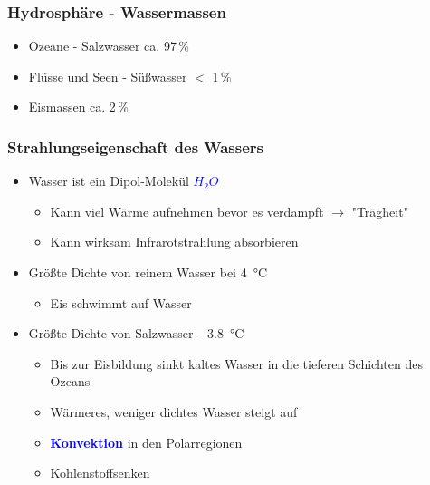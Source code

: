 \begin{frame}
	\frametitle{Hydrosphäre - Wassermassen}
	\begin{itemize}
		\item Ozeane - Salzwasser ca. 97\,\%
		\item Flüsse und Seen - Süßwasser $<$ 1\,\%
		\item Eismassen ca. 2\,\% %
	\end{itemize}
\end{frame}


\begin{frame}
	\frametitle{Strahlungseigenschaft des Wassers} %
	\begin{itemize}
		\item Wasser ist ein Dipol-Molekül \textcolor{blue}{$H_2O$}
		\begin{itemize}			
			\item<2->[$\rightarrow$] Kann viel Wärme aufnehmen bevor es verdampft $\rightarrow$ "Trägheit"
			\item<2->[$\rightarrow$] Kann wirksam Infrarotstrahlung absorbieren
		\end{itemize}
		
		\item<3-> Größte Dichte von reinem Wasser bei \SI{4}{\degreeCelsius}
		\begin{itemize}
			\item<4->[$\rightarrow$] Eis schwimmt auf Wasser
		\end{itemize}		
		\item<5->Größte Dichte von Salzwasser \SI{-3,8}{\degreeCelsius}
		\begin{itemize}
			\item<6->[$\rightarrow$] Bis zur Eisbildung sinkt kaltes Wasser in die tieferen Schichten des Ozeans
			\item<6-> [$\rightarrow$] Wärmeres, weniger dichtes Wasser steigt auf
			\item<6-> [] \textbf{\textcolor{blue}{Konvektion}} in den Polarregionen 
			\item<6-> [$\rightarrow$] Kohlenstoffsenken
		\end{itemize}
	\end{itemize}


\end{frame}

